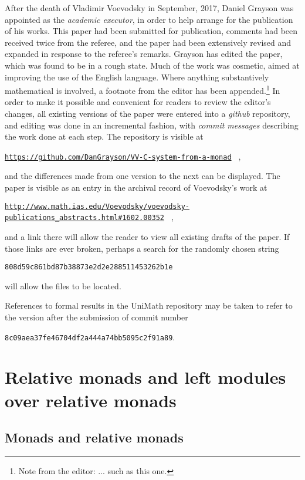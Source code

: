 \documentclass[12pt]{amsart}
\numberwithin{proposition}{subsection}
\newcommand{\wh}{\widehat}
\newcommand{\editorfootnote}[1]{\footnote{Note from the editor: #1}}
\begin{document}
After the death of Vladimir Voevodsky in
September, 2017, Daniel Grayson was appointed as the {\em academic executor},
in order to help arrange for the publication of his works.  This paper had been
submitted for publication, comments had been received twice from the referee,
and the paper had been extensively revised and expanded in response to the
referee's remarks.  Grayson has edited the paper, which was found
to be in a rough state.  Much of the work was cosmetic, aimed at improving the
use of the English language.  Where anything substantively mathematical is
involved, a footnote from the editor has been appended.\editorfootnote{... such
  as this one.}
In order to make it possible and convenient for readers to review the editor's
changes, all existing versions of the paper were entered into a {\em github}
repository, and editing was done in an incremental fashion, with {\em commit
  messages} describing the work done at each step.  The repository is visible
at
\hfill\break\centerline{\tiny{\tt \href{https://github.com/DanGrayson/VV-C-system-from-a-monad}{https://github.com/DanGrayson/VV-C-system-from-a-monad}%
  } ,}
and the differences made from one version to the next can be displayed.
The paper is visible as an entry in the archival record of Voevodsky's work at
\hfill\break\centerline{\tiny{\tt \href{http://www.math.ias.edu/Voevodsky/voevodsky-publications\_abstracts.html\#1602.00352}{http://www.math.ias.edu/Voevodsky/voevodsky-publications\_abstracts.html\#1602.00352}%
  } ,}
and a link there will allow the reader to view all existing drafts of the paper.
If those links are ever broken, perhaps a search for the randomly chosen string
\hfill\break\centerline{\tiny{\tt 808d59c861bd87b38873e2d2e288511453262b1e}}
will allow the files to be located.

References to formal results in the UniMath repository \cite{UniMath} may be
taken to refer to the version after the submission of commit number
\hfill\break\centerline{\tiny{\tt 8c09aea37fe46704df2a444a74bb5095c2f91a89}.}


\section{Relative monads and left modules over relative monads}

\subsection{Monads and relative monads} 
\end{document}
